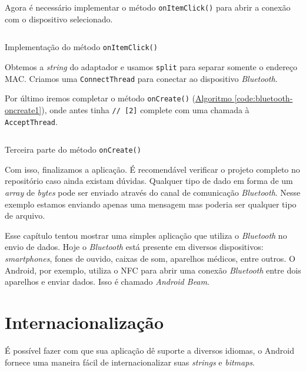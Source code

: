 \documentclass[a4paper,12pt,brazil,oneside]{book}
\begin{document}
\begin{singlespace}
	Agora é necessário implementar o método \texttt{onItemClick()} para abrir a conexão com o dispositivo selecionado.

	\begin{listing}[H]
	\inputminted[linenos=true,fontsize=\small,frame=lines, framesep=2mm, tabsize=2,numbersep=5pt]{java}{src/api/bluetooth/onitemclick.java}
	\caption{Implementação do método \texttt{onItemClick()}}
	\label{code:bluetooth-onitemclick}
	\end{listing} 	

	Obtemos a \emph{string} do adaptador e usamos \texttt{split} para separar somente o endereço MAC. Criamos uma \texttt{ConnectThread} para conectar ao dispositivo \emph{Bluetooth}.

	Por último iremos completar o método \texttt{onCreate()} (\hyperref[code:bluetooth-oncreate1]{Algoritmo \ref*{code:bluetooth-oncreate1}}), onde antes tinha \texttt{// [2]} complete com uma chamada à \texttt{AcceptThread}. 

	\begin{listing}[H]
	\inputminted[linenos=true,fontsize=\small,frame=lines, framesep=2mm, tabsize=2,numbersep=5pt]{java}{src/api/bluetooth/oncreate3.java}
	\caption{Terceira parte do método \texttt{onCreate()}}
	\label{code:bluetooth-oncreate3}
	\end{listing} 	

	Com isso, finalizamos a aplicação. É recomendável verificar o projeto completo no repositório caso ainda existam dúvidas. Qualquer tipo de dado em forma de um \emph{array} de \emph{bytes} pode ser enviado através do canal de comunicação \emph{Bluetooth}. Nesse exemplo estamos enviando apenas uma mensagem mas poderia ser qualquer tipo de arquivo.

	Esse capítulo tentou mostrar uma simples aplicação que utiliza o \emph{Bluetooth} no envio de dados. Hoje o \emph{Bluetooth} está presente em diversos dispositivos: \emph{smartphones}, fones de ouvido, caixas de som, aparelhos médicos, entre outros. O Android, por exemplo, utiliza o NFC para abrir uma conexão \emph{Bluetooth} entre dois aparelhos e enviar dados. Isso é chamado \emph{Android Beam}. 

\chapter{Internacionalização}

	É possível fazer com que sua aplicação dê suporte a diversos idiomas, o Android fornece uma maneira fácil de internacionalizar suas \emph{strings} e \emph{bitmaps}. 


\end{singlespace}
\end{document}

